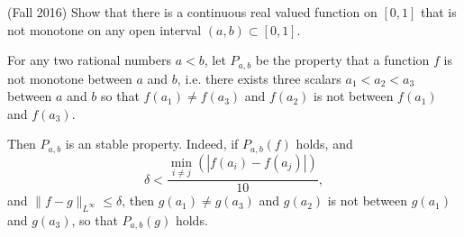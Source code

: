 \documentclass[answers]{exam}
\begin{document}
\begin{questions}
\item (Fall 2016) Show that there is a continuous real valued function on $[0,1]$ that is not monotone on any open interval $(a,b)\subset [0,1]$.

  


\begin{solution}
	For any two rational numbers $a < b$, let $P_{a,b}$ be the property that a function $f$ is not monotone between $a$ and $b$, i.e. there exists three scalars $a_1 < a_2 < a_3$ between $a$ and $b$ so that $f(a_1) \neq f(a_3)$ and $f(a_2)$ is not between $f(a_1)$ and $f(a_3)$.

	Then $P_{a,b}$ is an stable property. Indeed, if $P_{a,b}(f)$ holds, and
	\[ \delta < \frac{\min_{i \neq j}(|f(a_i) - f(a_j)|)}{10}, \]
	and $\| f - g \|_{L^\infty} \leq \delta$, then $g(a_1) \neq g(a_3)$ and $g(a_2)$ is not between $g(a_1)$ and $g(a_3)$, so that $P_{a,b}(g)$ holds.


\end{solution}
\end{questions}
\end{document}
